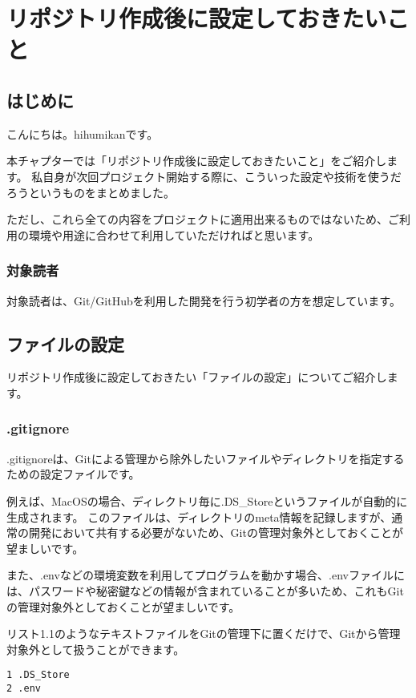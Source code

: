 \chapter{リポジトリ作成後に設定しておきたいこと}
\section{はじめに}
こんにちは。hihumikanです。

本チャプターでは「リポジトリ作成後に設定しておきたいこと」をご紹介します。
私自身が次回プロジェクト開始する際に、こういった設定や技術を使うだろうというものをまとめました。

ただし、これら全ての内容をプロジェクトに適用出来るものではないため、ご利用の環境や用途に合わせて利用していただければと思います。

\subsection{対象読者}

対象読者は、Git/GitHubを利用した開発を行う初学者の方を想定しています。

\section{ファイルの設定}

リポジトリ作成後に設定しておきたい「ファイルの設定」についてご紹介します。

\subsection{.gitignore}

.gitignoreは、Gitによる管理から除外したいファイルやディレクトリを指定するための設定ファイルです。

例えば、MacOSの場合、ディレクトリ毎に.DS\_Storeというファイルが自動的に生成されます。
このファイルは、ディレクトリのmeta情報を記録しますが、通常の開発において共有する必要がないため、Gitの管理対象外としておくことが望ましいです。

また、.envなどの環境変数を利用してプログラムを動かす場合、.envファイルには、パスワードや秘密鍵などの情報が含まれていることが多いため、これもGitの管理対象外としておくことが望ましいです。

リスト1.1のようなテキストファイルをGitの管理下に置くだけで、Gitから管理対象外として扱うことができます。

\begin{tcolorbox}[title=リスト1.1 .gitignore]
  \begin{verbatim}
1 .DS_Store
2 .env
\end{verbatim}
\end{tcolorbox}

